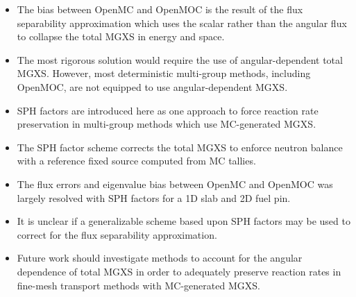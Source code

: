 \vfill
\begin{highlightsbox}[frametitle=Highlights]
\begin{itemize}
  \item The bias between OpenMC and OpenMOC is the result of the flux separability approximation which uses the scalar rather than the angular flux to collapse the total \ac{MGXS} in energy and space.
  \item The most rigorous solution would require the use of angular-dependent total \ac{MGXS}. However, most deterministic multi-group methods, including OpenMOC, are not equipped to use angular-dependent \ac{MGXS}.
  \item \ac{SPH} factors are introduced here as one approach to force reaction rate preservation in multi-group methods which use \ac{MC}-generated \ac{MGXS}.
  \item The \ac{SPH} factor scheme corrects the total \ac{MGXS} to enforce neutron balance with a reference fixed source computed from \ac{MC} tallies.
  \item The flux errors and eigenvalue bias between OpenMC and OpenMOC was largely resolved with \ac{SPH} factors for a 1D slab and 2D fuel pin.
  \item It is unclear if a generalizable scheme based upon \ac{SPH} factors may be used to correct for the flux separability approximation.
  \item Future work should investigate methods to account for the angular dependence of total \ac{MGXS} in order to adequately preserve reaction rates in fine-mesh transport methods with \ac{MC}-generated \ac{MGXS}.
\end{itemize}
\end{highlightsbox}
\vfill